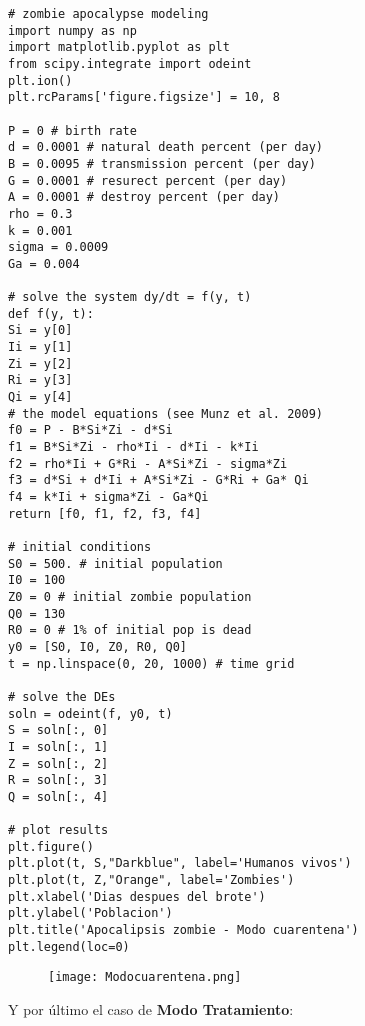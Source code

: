 \documentclass[a4 paper]{article}
\numberwithin{equation}{section}
\newcommand{\0}{\mathbf{0}}
\begin{document}
\begin{verbatim}
# zombie apocalypse modeling
import numpy as np
import matplotlib.pyplot as plt
from scipy.integrate import odeint
plt.ion()
plt.rcParams['figure.figsize'] = 10, 8

P = 0 # birth rate
d = 0.0001 # natural death percent (per day)
B = 0.0095 # transmission percent (per day)
G = 0.0001 # resurect percent (per day)
A = 0.0001 # destroy percent (per day)
rho = 0.3
k = 0.001
sigma = 0.0009
Ga = 0.004

# solve the system dy/dt = f(y, t)
def f(y, t):
Si = y[0]
Ii = y[1]
Zi = y[2]
Ri = y[3]
Qi = y[4]
# the model equations (see Munz et al. 2009)
f0 = P - B*Si*Zi - d*Si
f1 = B*Si*Zi - rho*Ii - d*Ii - k*Ii
f2 = rho*Ii + G*Ri - A*Si*Zi - sigma*Zi
f3 = d*Si + d*Ii + A*Si*Zi - G*Ri + Ga* Qi
f4 = k*Ii + sigma*Zi - Ga*Qi
return [f0, f1, f2, f3, f4]

# initial conditions
S0 = 500. # initial population
I0 = 100
Z0 = 0 # initial zombie population
Q0 = 130
R0 = 0 # 1% of initial pop is dead
y0 = [S0, I0, Z0, R0, Q0]
t = np.linspace(0, 20, 1000) # time grid

# solve the DEs
soln = odeint(f, y0, t)
S = soln[:, 0]
I = soln[:, 1]
Z = soln[:, 2]
R = soln[:, 3]
Q = soln[:, 4]

# plot results
plt.figure()
plt.plot(t, S,"Darkblue", label='Humanos vivos')
plt.plot(t, Z,"Orange", label='Zombies')
plt.xlabel('Dias despues del brote')
plt.ylabel('Poblacion')
plt.title('Apocalipsis zombie - Modo cuarentena')
plt.legend(loc=0)
\end{verbatim}

\begin{figure}[!ht]
  \centering
      \texttt{[image: Modocuarentena.png]}
  \caption{}
\end{figure}

Y por \'ultimo el caso de {\bf Modo Tratamiento}:
\end{document}
